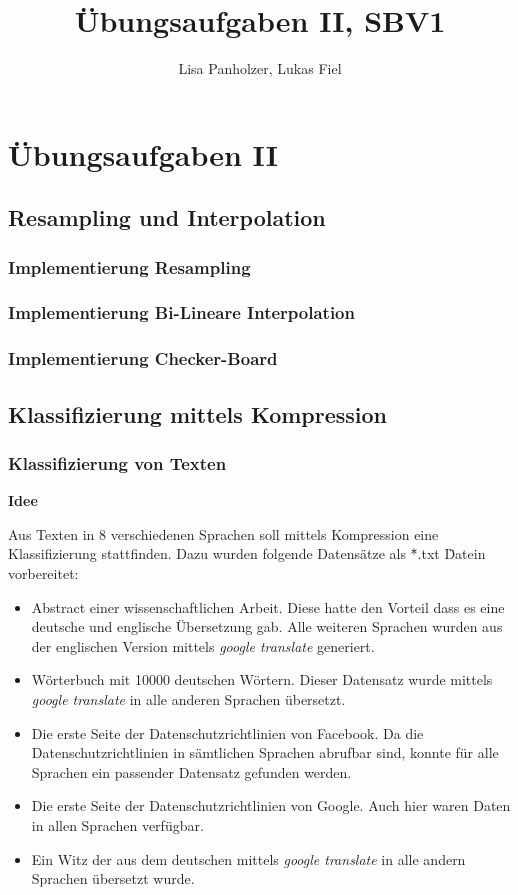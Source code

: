 \documentclass[12pt,german]{article}
\begin{document}
\title{Übungsaufgaben II, SBV1 }
\author{Lisa Panholzer, Lukas Fiel}
\maketitle


\newpage
\section{Übungsaufgaben II}
\subsection{Resampling und Interpolation}
\subsubsection{Implementierung Resampling}

\subsubsection{Implementierung Bi-Lineare Interpolation}

\subsubsection{Implementierung Checker-Board}

\subsection{Klassifizierung mittels Kompression}
\subsubsection{Klassifizierung von Texten}

\textbf{Idee}

Aus Texten in 8 verschiedenen Sprachen soll mittels Kompression eine Klassifizierung stattfinden. Dazu wurden folgende Datensätze als \" *.txt \" Datein vorbereitet:

\begin{itemize}
	\item Abstract einer wissenschaftlichen Arbeit. Diese hatte den Vorteil dass es eine deutsche und englische Übersetzung gab. Alle weiteren Sprachen wurden aus der englischen Version mittels \textit{google translate} generiert.
	\item Wörterbuch mit 10000 deutschen Wörtern. Dieser Datensatz wurde mittels \textit{google translate} in alle anderen Sprachen übersetzt.
	\item Die erste Seite der Datenschutzrichtlinien von Facebook. Da die Datenschutzrichtlinien in sämtlichen Sprachen abrufbar sind, konnte für alle Sprachen ein passender Datensatz gefunden werden.
	\item Die erste Seite der Datenschutzrichtlinien von Google. Auch hier waren Daten in allen Sprachen verfügbar.
	\item Ein Witz der aus dem deutschen mittels \textit{google translate} in alle andern Sprachen übersetzt wurde.
\end{itemize}
\end{document}
